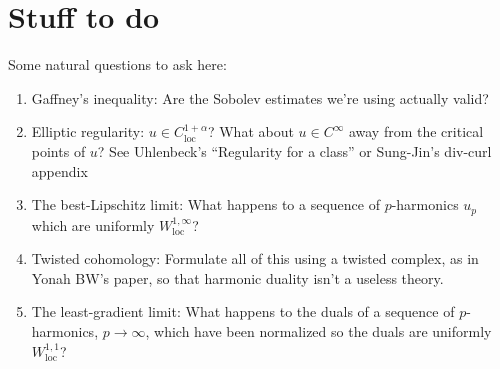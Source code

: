 \documentclass[reqno,10pt]{amsart}
\newcommand{\loc}{\mathrm{loc}}
\theoremstyle{definition}
\numberwithin{equation}{section}
\begin{document}
\section{Stuff to do}

Some natural questions to ask here:
\begin{enumerate}
\item Gaffney's inequality: Are the Sobolev estimates we're using actually valid?
\item Elliptic regularity: $u \in C^{1 + \alpha}_\loc$? What about $u \in C^\infty$ away from the critical points of $u$? See Uhlenbeck's ``Regularity for a class'' or Sung-Jin's div-curl appendix 
\item The best-Lipschitz limit: What happens to a sequence of $p$-harmonics $u_p$ which are uniformly $W^{1, \infty}_\loc$?
\item Twisted cohomology: Formulate all of this using a twisted complex, as in Yonah BW's paper, so that harmonic duality isn't a useless theory.
\item The least-gradient limit: What happens to the duals of a sequence of $p$-harmonics, $p \to \infty$, which have been normalized so the duals are uniformly $W^{1, 1}_\loc$?
\end{enumerate}




\printbibliography
\end{document}
